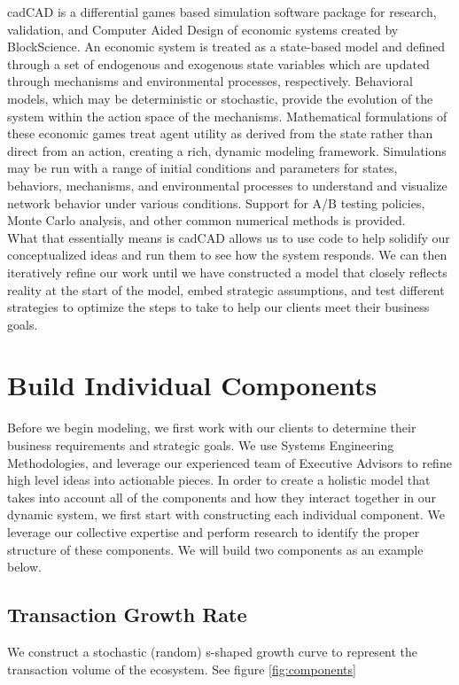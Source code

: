 \documentclass[12pt]{extarticle}
\begin{document}
\noindent
cadCAD is a differential games based simulation software package for research, validation, and Computer Aided Design of economic systems created by BlockScience. An economic system is treated as a state-based model and defined through a set of endogenous and exogenous state variables which are updated through mechanisms and environmental processes, respectively. Behavioral models, which may be deterministic or stochastic, provide the evolution of the system within the action space of the mechanisms. Mathematical formulations of these economic games treat agent utility as derived from the state rather than direct from an action, creating a rich, dynamic modeling framework. Simulations may be run with a range of initial conditions and parameters for states, behaviors, mechanisms, and environmental processes to understand and visualize network behavior under various conditions. Support for A/B testing policies, Monte Carlo analysis, and other common numerical methods is provided. \\ 

\noindent
What that essentially means is cadCAD allows us to use code to help solidify our conceptualized ideas and run them to see how the system responds. We can then iteratively refine our work until we have constructed a model that closely reflects reality at the start of the model, embed strategic assumptions, and test different strategies to optimize the steps to take to help our clients meet their business goals. 

\section{Build Individual Components}
Before we begin modeling, we first work with our clients to determine their business requirements and strategic goals. We use Systems Engineering Methodologies, and leverage our experienced team of Executive Advisors to refine high level ideas into actionable pieces. In order to create a holistic model that takes into account all of the components and how they interact together in our dynamic system, we first start with constructing each individual component. We leverage our collective expertise and perform research to identify the proper structure of these components.  We will build two components as an example below.

\subsection{Transaction Growth Rate}
We construct a stochastic (random) s-shaped growth curve to represent the transaction volume of the ecosystem. See figure \ref{fig:components}
\end{document}
